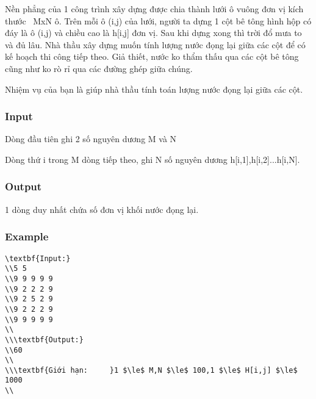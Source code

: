 



   Nền phẳng của 1 công trình xây dựng được chia thành lưới ô vuông đơn vị kích thước  MxN ô. Trên mỗi ô (i,j) của lưới, người ta dựng 1 cột bê tông hình hộp có đáy là ô (i,j) và chiều cao là h[i,j] đơn vị. Sau khi dựng xong thì trời đổ mưa to và đủ lâu. Nhà thầu xây dựng muốn tính lượng nước đọng lại giữa các cột để có kế hoạch thi công tiếp theo. Giả thiết, nước ko thẩm thấu qua các cột bê tông cũng như ko rò rỉ qua các đường ghép giữa chúng.  

   Nhiệm vụ của bạn là giúp nhà thầu tính toán lượng nước đọng lại giữa các cột.  

\subsubsection{   Input  }

   Dòng đầu tiên ghi 2 số nguyên dương M và N  

   Dòng thứ i trong M dòng tiếp theo, ghi N số nguyên dương h[i,1],h[i,2]...h[i,N].  

\subsubsection{   Output  }

   1 dòng duy nhất chứa số đơn vị khối nước đọng lại.  



\subsubsection{   Example  }
\begin{verbatim}
\textbf{Input:}
\\5 5
\\9 9 9 9 9
\\9 2 2 2 9
\\9 2 5 2 9
\\9 2 2 2 9
\\9 9 9 9 9
\\
\\\textbf{Output:}
\\60
\\
\\\textbf{Giới hạn:     }1 $\le$ M,N $\le$ 100,1 $\le$ H[i,j] $\le$ 1000
\\\end{verbatim}
